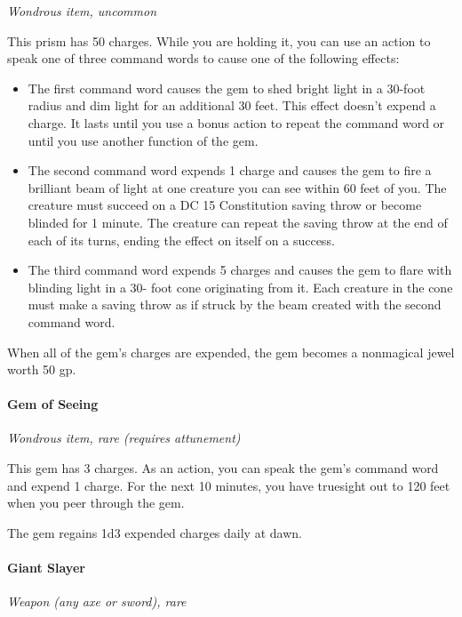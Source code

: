 \documentclass[
]{article}
\begin{document}
\emph{Wondrous item, uncommon}

This prism has 50 charges. While you are holding it, you can use an
action to speak one of three command words to cause one of the following
effects:

\begin{itemize}
\item
  The first command word causes the gem to shed bright light in a
  30-foot radius and dim light for an additional 30 feet. This effect
  doesn't expend a charge. It lasts until you use a bonus action to
  repeat the command word or until you use another function of the gem.
\item
  The second command word expends 1 charge and causes the gem to fire a
  brilliant beam of light at one creature you can see within 60 feet of
  you. The creature must succeed on a DC 15 Constitution saving throw or
  become blinded for 1 minute. The creature can repeat the saving throw
  at the end of each of its turns, ending the effect on itself on a
  success.
\item
  The third command word expends 5 charges and causes the gem to flare
  with blinding light in a 30- foot cone originating from it. Each
  creature in the cone must make a saving throw as if struck by the beam
  created with the second command word.
\end{itemize}

When all of the gem's charges are expended, the gem becomes a nonmagical
jewel worth 50 gp.

\hypertarget{gem-of-seeing}{%
\paragraph{Gem of Seeing}\label{gem-of-seeing}}

\emph{Wondrous item, rare (requires attunement)}

This gem has 3 charges. As an action, you can speak the gem's command
word and expend 1 charge. For the next 10 minutes, you have truesight
out to 120 feet when you peer through the gem.

The gem regains 1d3 expended charges daily at dawn.

\hypertarget{giant-slayer}{%
\paragraph{Giant Slayer}\label{giant-slayer}}

\emph{Weapon (any axe or sword), rare}
\end{document}
